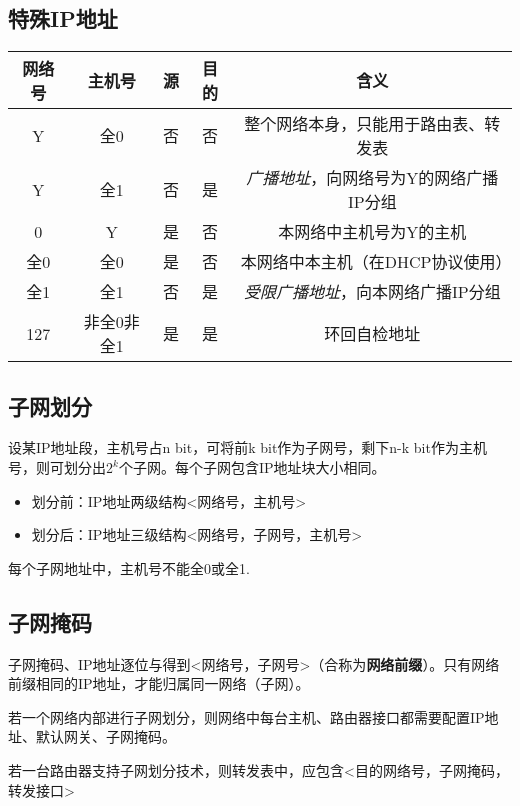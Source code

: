 \subsection{特殊IP地址}
\begin{center}
    \begin{tabular}{c|c|c|c|c}
        \hline
        网络号 & 主机号 & 源 & 目的 & 含义 \\
        \hline
        Y & 全0 & 否 & 否 & 整个网络本身，只能用于路由表、转发表 \\ 
        \hline
        Y & 全1 & 否 & 是 & \textit{广播地址}，向网络号为Y的网络广播IP分组 \\ 
        \hline
        0 & Y & 是 & 否 & 本网络中主机号为Y的主机 \\ 
        \hline
        全0 & 全0 & 是 & 否 & 本网络中本主机（在DHCP协议使用） \\
        \hline
        全1 & 全1 & 否 & 是 & \textit{受限广播地址}，向本网络广播IP分组 \\ 
        \hline
        127 & 非全0非全1 & 是 & 是 & 环回自检地址 \\ 
        \hline
    \end{tabular}
\end{center}


\subsection{子网划分}
设某IP地址段，主机号占n bit，可将前k bit作为子网号，剩下n-k bit作为主机号，则可划分出\(2^k\)个子网。每个子网包含IP地址块大小相同。

\begin{itemize}
    \item 划分前：IP地址两级结构<网络号，主机号>
    \item 划分后：IP地址三级结构<网络号，子网号，主机号>
\end{itemize}

每个子网地址中，主机号不能全0或全1.


\subsection{子网掩码}
子网掩码、IP地址逐位与得到<网络号，子网号>（合称为\textbf{网络前缀}）。只有网络前缀相同的IP地址，才能归属同一网络（子网）。

若一个网络内部进行子网划分，则网络中每台主机、路由器接口都需要配置IP地址、默认网关、子网掩码。

若一台路由器支持子网划分技术，则转发表中，应包含<目的网络号，子网掩码，转发接口>

